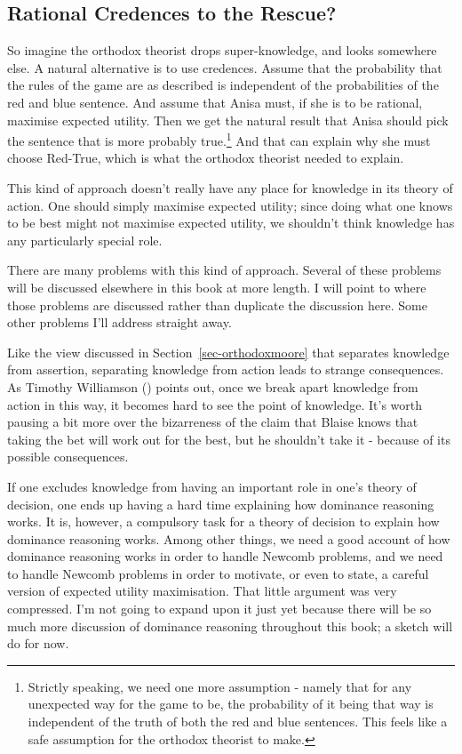 \documentclass[
  12pt,
  letterpaper,
]{scrbook}
\begin{document}
\subsection{Rational Credences to the Rescue?}\label{sec-probrescue}

So imagine the orthodox theorist drops super-knowledge, and looks
somewhere else. A natural alternative is to use credences. Assume that
the probability that the rules of the game are as described is
independent of the probabilities of the red and blue sentence. And
assume that Anisa must, if she is to be rational, maximise expected
utility. Then we get the natural result that Anisa should pick the
sentence that is more probably true.\footnote{Strictly speaking, we need
  one more assumption - namely that for any unexpected way for the game
  to be, the probability of it being that way is independent of the
  truth of both the red and blue sentences. This feels like a safe
  assumption for the orthodox theorist to make.} And that can explain
why she must choose Red-True, which is what the orthodox theorist needed
to explain.

This kind of approach doesn't really have any place for knowledge in its
theory of action. One should simply maximise expected utility; since
doing what one knows to be best might not maximise expected utility, we
shouldn't think knowledge has any particularly special role.

There are many problems with this kind of approach. Several of these
problems will be discussed elsewhere in this book at more length. I will
point to where those problems are discussed rather than duplicate the
discussion here. Some other problems I'll address straight away.

Like the view discussed in Section~\ref{sec-orthodoxmoore} that
separates knowledge from assertion, separating knowledge from action
leads to strange consequences. As Timothy Williamson
() points out, once we break apart
knowledge from action in this way, it becomes hard to see the point of
knowledge. It's worth pausing a bit more over the bizarreness of the
claim that Blaise knows that taking the bet will work out for the best,
but he shouldn't take it - because of its possible consequences.

If one excludes knowledge from having an important role in one's theory
of decision, one ends up having a hard time explaining how dominance
reasoning works. It is, however, a compulsory task for a theory of
decision to explain how dominance reasoning works. Among other things,
we need a good account of how dominance reasoning works in order to
handle Newcomb problems, and we need to handle Newcomb problems in order
to motivate, or even to state, a careful version of expected utility
maximisation. That little argument was very compressed. I'm not going to
expand upon it just yet because there will be so much more discussion of
dominance reasoning throughout this book; a sketch will do for now.
\end{document}
